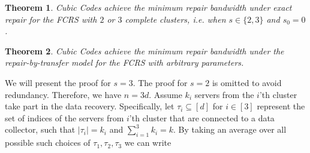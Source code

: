 \documentclass[journal,onecolumn,draftcls]{IEEEtran}
\newtheorem{theorem}{Theorem}
\begin{document}
\begin{theorem}
Cubic Codes achieve the minimum repair bandwidth under exact repair for the FCRS with $2$ or $3$ complete clusters, i.e. when $s\in \{2,3\}$ and $s_0 = 0$.
\label{thm:ssmall}
\end{theorem}
\begin{theorem}
Cubic Codes achieve the minimum repair bandwidth under the repair-by-transfer model for the FCRS with arbitrary parameters.
\label{thm:rbt}
\end{theorem}
\begin{IEEEproof}
We will present the proof for $s = 3$. The proof for $s = 2$ is omitted to avoid redundancy. Therefore, we have $n = 3d$. Assume $k_i$ servers from the $i$'th cluster take part in the data recovery. Specifically, let $\tau_{i}\subseteq [d]$ for $i\in[3]$ represent the set of indices of the servers from $i$'th cluster that are connected to a data collector, such that $|\tau_i| = k_i$ and $\sum_{i=1}^3 k_i = k$. By taking an average over all possible such choices of $\tau_1,\tau_2,\tau_{3}$ we can write 


\end{IEEEproof}
\end{document}
